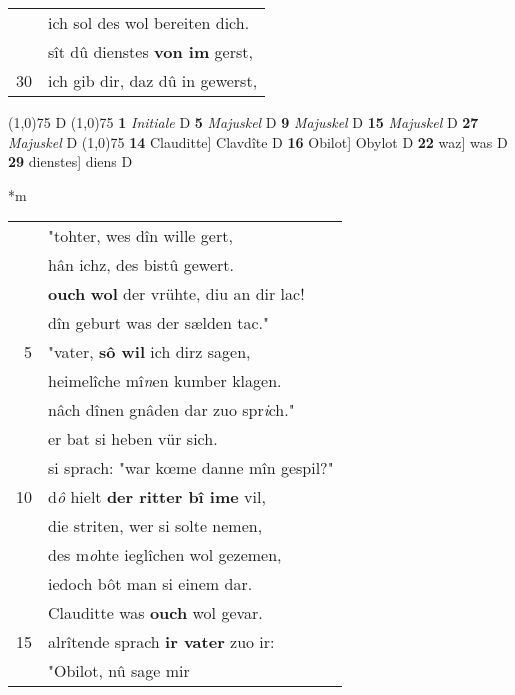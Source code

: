 \documentclass[8pt,a4paper,notitlepage]{article}
\begin{document}
\begin{table}[ht]
\begin{minipage}[t]{0.5\linewidth}
\begin{tabular}{rl}
 & ich sol des wol bereiten dich.\\ 
 & sît dû dienstes \textbf{von im} gerst,\\ 
30 & ich gib dir, daz dû in gewerst,\\ 
\end{tabular}
\scriptsize
\line(1,0){75} \newline
D \newline
\line(1,0){75} \newline
\textbf{1} \textit{Initiale} D  \textbf{5} \textit{Majuskel} D  \textbf{9} \textit{Majuskel} D  \textbf{15} \textit{Majuskel} D  \textbf{27} \textit{Majuskel} D  \newline
\line(1,0){75} \newline
\textbf{14} Clauditte] Clavdîte D \textbf{16} Obilot] Obylot D \textbf{22} waz] was D \textbf{29} dienstes] diens D \newline
\end{minipage}
\hspace{0.5cm}
\begin{minipage}[t]{0.5\linewidth}
\small
\begin{center}*m
\end{center}
\begin{tabular}{rl}
 & "tohter, wes dîn wille gert,\\ 
 & hân ichz, des bistû gewert.\\ 
 & \textbf{ouch} \textbf{wol} der vrühte, diu an dir lac!\\ 
 & dîn geburt was der sælden tac."\\ 
5 & "vater, \textbf{sô wil} ich dirz sagen,\\ 
 & heimelîche mî\textit{n}en kumber klagen.\\ 
 & nâch dînen gnâden dar zuo spr\textit{i}ch."\\ 
 & er bat si heben vür sich.\\ 
 & si sprach: "war kœme danne mîn gespil?"\\ 
10 & d\textit{ô} hielt \textbf{der ritter bî ime} vil,\\ 
 & die striten, wer si solte nemen,\\ 
 & des m\textit{o}hte ieglîchen wol gezemen,\\ 
 & iedoch bôt man si einem dar.\\ 
 & Clauditte was \textbf{ouch} wol gevar.\\ 
15 & alrîtende sprach \textbf{ir vater} zuo ir:\\ 
 & "Obilot, nû sage mir\\ 

\end{tabular}
\end{minipage}
\end{table}
\end{document}
